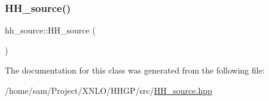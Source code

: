 \subsubsection{\texorpdfstring{H\+H\+\_\+source()}{HH\_source()}}
{\footnotesize\ttfamily hh\+\_\+source\+::\+H\+H\+\_\+source (\begin{DoxyParamCaption}{ }\end{DoxyParamCaption})}



The documentation for this class was generated from the following file\+:\begin{DoxyCompactItemize}
\item 
/home/sam/\+Project/\+X\+N\+L\+O/\+H\+H\+G\+P/src/\hyperlink{_h_h__source_8hpp}{H\+H\+\_\+source.\+hpp}\end{DoxyCompactItemize}
